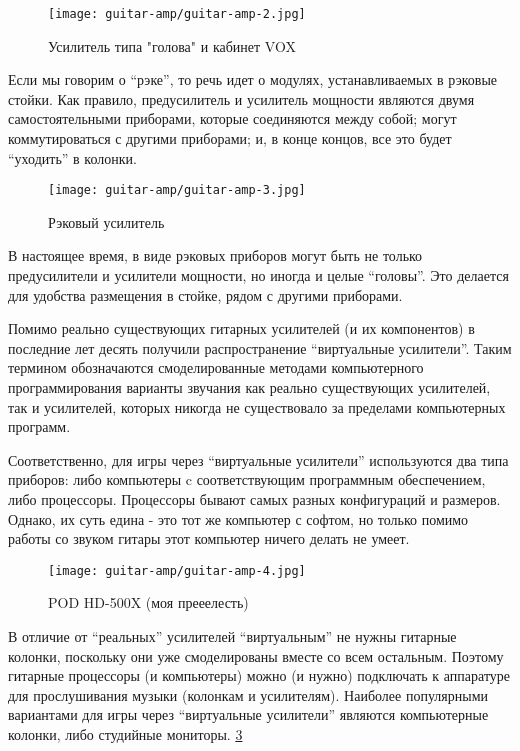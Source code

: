 \begin{figure}[h]
\centering
\texttt{[image: guitar-amp/guitar-amp-2.jpg]}
\caption{Усилитель типа "голова" и кабинет VOX}
\label{guitar-amp:2}
\end{figure}

Если мы говорим о “рэке”, то речь идет о модулях, устанавливаемых в рэковые стойки. Как правило, предусилитель и усилитель мощности являются двумя самостоятельными приборами, которые соединяются между собой; могут коммутироваться с другими приборами; и, в конце концов, все это будет “уходить” в колонки.
\begin{figure}[h]
\centering
\texttt{[image: guitar-amp/guitar-amp-3.jpg]}

\caption{Рэковый усилитель}
\label{guitar-amp:3}
\end{figure}

В настоящее время, в виде рэковых приборов могут быть не только предусилители и усилители мощности, но иногда и целые “головы”. Это делается для удобства размещения в стойке, рядом с другими приборами.

Помимо реально существующих гитарных усилителей (и их компонентов) в последние лет десять получили распространение “виртуальные усилители”. Таким термином обозначаются смоделированные методами компьютерного программирования варианты звучания как реально существующих усилителей, так и усилителей, которых никогда не существовало за пределами компьютерных программ.

Соответственно, для игры через “виртуальные усилители” используются два типа приборов: либо компьютеры c соответствующим программным обеспечением, либо процессоры. Процессоры бывают самых разных конфигураций и размеров. Однако, их суть едина - это тот же компьютер с софтом, но только помимо работы со звуком гитары этот компьютер ничего делать не умеет.
\begin{figure}[h]
\centering
\texttt{[image: guitar-amp/guitar-amp-4.jpg]}

\caption{POD HD-500X (моя прееелесть)}
\label{guitar-amp:POD-HD500X}
\end{figure}

В отличие от “реальных” усилителей “виртуальным” не нужны гитарные колонки, поскольку они уже смоделированы вместе со всем остальным. Поэтому гитарные процессоры (и компьютеры) можно (и нужно) подключать к аппаратуре для прослушивания музыки (колонкам и усилителям). Наиболее популярными вариантами для игры через “виртуальные усилители” являются компьютерные колонки, либо студийные мониторы. \ref{guitar-amp:POD-HD500X} %

